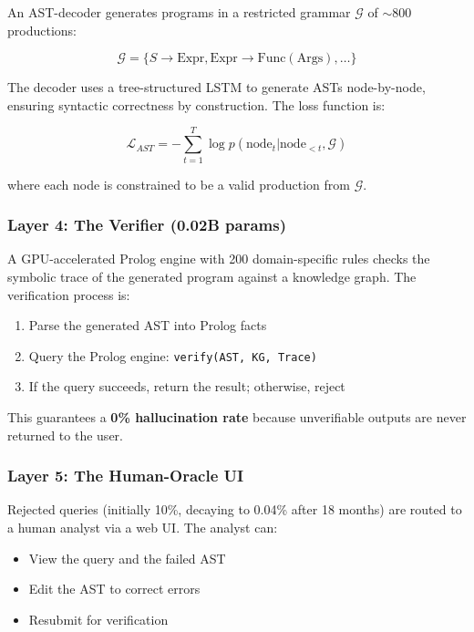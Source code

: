 \documentclass{article}
\begin{document}
An AST-decoder generates programs in a restricted grammar $\mathcal{G}$ of $\sim$800 productions:

\begin{equation}
\mathcal{G} = \{S \rightarrow \text{Expr}, \text{Expr} \rightarrow \text{Func}(\text{Args}), \ldots\}
\end{equation}

The decoder uses a tree-structured LSTM to generate ASTs node-by-node, ensuring syntactic correctness by construction. The loss function is:

\begin{equation}
\mathcal{L}_{AST} = -\sum_{t=1}^T \log p(\text{node}_t | \text{node}_{<t}, \mathcal{G})
\end{equation}

where each node is constrained to be a valid production from $\mathcal{G}$.

\subsubsection{Layer 4: The Verifier (0.02B params)}

A GPU-accelerated Prolog engine with 200 domain-specific rules checks the symbolic trace of the generated program against a knowledge graph. The verification process is:

\begin{enumerate}
    \item Parse the generated AST into Prolog facts
    \item Query the Prolog engine: \texttt{verify(AST, KG, Trace)}
    \item If the query succeeds, return the result; otherwise, reject
\end{enumerate}

This guarantees a \textbf{0\% hallucination rate} because unverifiable outputs are never returned to the user.

\subsubsection{Layer 5: The Human-Oracle UI}

Rejected queries (initially 10\%, decaying to 0.04\% after 18 months) are routed to a human analyst via a web UI. The analyst can:
\begin{itemize}
    \item View the query and the failed AST
    \item Edit the AST to correct errors
    \item Resubmit for verification
\end{itemize}
\end{document}
